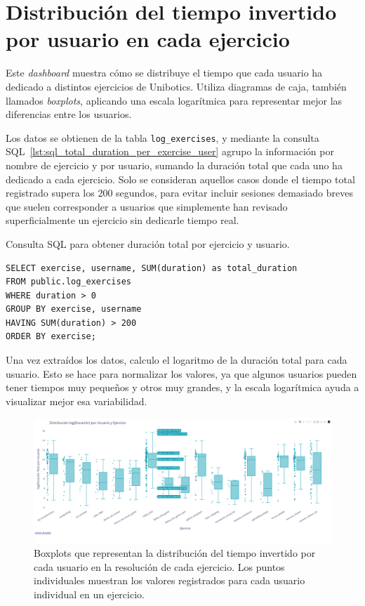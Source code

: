 \documentclass[a4paper, 12pt]{book}
\begin{document}
\section{Distribución del tiempo invertido por usuario en cada ejercicio}
\label{sec:dash3b}

Este \textit{dashboard} muestra cómo se distribuye el tiempo que cada usuario ha dedicado a distintos ejercicios de Unibotics. Utiliza diagramas de caja, también llamados \textit{boxplots}, aplicando una escala logarítmica para representar mejor las diferencias entre los usuarios.

Los datos se obtienen de la tabla \texttt{log\_exercises}, y mediante la consulta SQL~\ref{lst:sql_total_duration_per_exercise_user} agrupo la información por nombre de ejercicio y por usuario, sumando la duración total que cada uno ha dedicado a cada ejercicio. Solo se consideran aquellos casos donde el tiempo total registrado supera los 200 segundos, para evitar incluir sesiones demasiado breves que suelen corresponder a usuarios que simplemente han revisado superficialmente un ejercicio sin dedicarle tiempo real.

\begin{listing}[h!]
\caption{Consulta SQL para obtener duración total por ejercicio y usuario.}
\label{lst:sql_total_duration_per_exercise_user}
\begin{verbatim}
SELECT exercise, username, SUM(duration) as total_duration
FROM public.log_exercises
WHERE duration > 0
GROUP BY exercise, username
HAVING SUM(duration) > 200
ORDER BY exercise;
\end{verbatim}
\end{listing}

Una vez extraídos los datos, calculo el logaritmo de la duración total para cada usuario. Esto se hace para normalizar los valores, ya que algunos usuarios pueden tener tiempos muy pequeños y otros muy grandes, y la escala logarítmica ayuda a visualizar mejor esa variabilidad.


\begin{figure}[H]
  \centering
  \includegraphics[width=1.1\textwidth]{img/3bb.png}
  \caption{Boxplots que representan la distribución del tiempo invertido por cada usuario en la resolución de cada ejercicio. Los puntos individuales muestran los valores registrados para cada usuario individual en un ejercicio.}
  \label{fig:3b}
\end{figure}
\end{document}
